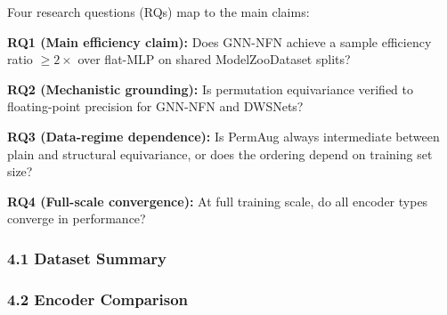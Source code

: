 
Four research questions (RQs) map to the main claims:

\textbf{RQ1 (Main efficiency claim):} Does GNN-NFN achieve a sample efficiency ratio $\geq 2\times$ over flat-MLP on shared ModelZooDataset splits?

\textbf{RQ2 (Mechanistic grounding):} Is permutation equivariance verified to floating-point precision for GNN-NFN and DWSNets?

\textbf{RQ3 (Data-regime dependence):} Is PermAug always intermediate between plain and structural equivariance, or does the ordering depend on training set size?

\textbf{RQ4 (Full-scale convergence):} At full training scale, do all encoder types converge in performance?

\subsubsection{4.1 Dataset Summary}

\begin{table}[htbp]
\centering
{}
\end{table}

\subsubsection{4.2 Encoder Comparison}

\begin{table}[htbp]
\centering
{}
\end{table}

